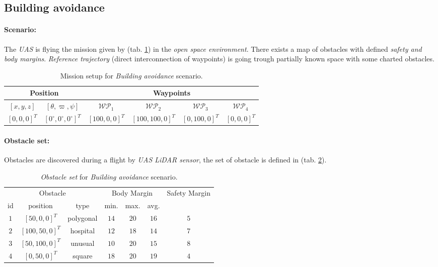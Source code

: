 \subsection{Building avoidance}\label{s:testBuildingAvoidance}

\noindent \paragraph{Scenario:} The \emph{UAS}  is flying the mission given by (tab. \ref{tab:missionSetupForBuildingAvoidanceScenario}) in the \emph{open space environment}. There exists a map of obstacles with defined \emph{safety and body margins}. \emph{Reference trajectory} (direct interconnection of waypoints) is going trough partially known space with some charted obstacles. 

\begin{table}[H]
	\centering
	\begin{tabular}{c|c||c|c|c|c}
		\multicolumn{2}{c||}{Position} & \multicolumn{4}{c}{Waypoints} \\\hline
		$[x,y,z]$     & $[\theta,\varpi,\psi]$           & $\mathscr{WP}_1$   & $\mathscr{WP}_2$   & $\mathscr{WP}_3$   & $\mathscr{WP}_4$    \\\hline\hline
		$[0,0,0]^T $       & $[0^\circ,0^\circ,0^\circ]^T$ & $[100,0,0]^T$       & $[100,100,0]^T$       & $[0,100,0]^T$       & $[0,0,0]^T$      
	\end{tabular}
	\caption{Mission setup for \emph{Building avoidance} scenario.}
	\label{tab:missionSetupForBuildingAvoidanceScenario}
\end{table}

\noindent \paragraph{Obstacle set:} Obstacles are discovered during a flight by \emph{UAS LiDAR sensor}, the set of obstacle is defined in (tab. \ref{tab:obstacleSetBuildingAvoidance}). 

\begin{table}[H]
	\centering
	\begin{tabular}{c|c|c|c|c|c|c}
		\multicolumn{3}{c|}{Obstacle} & \multicolumn{3}{c|}{Body Margin} & \multirow{2}{*}{Safety Margin}\\\cline{1-6}
		id & position & type & min. & max. & avg. &   \\\hline\hline
		$1$ & $[50,0,0]^T$ & polygonal & $14$ & $20$ & $16$ & $5$ \\\hline
		$2$ & $[100,50,0]^T$ & hospital & $12$ & $18$ & $14$ & $7$ \\\hline 
		$3$ & $[50,100,0]^T$ & unusual  & $10$ & $20$ & $15$ & $8$ \\\hline
		$4$ & $[0,50,0]^T$ & square & $18$ & $20$ & $19$ & $4$ \\
	 \end{tabular}
	\caption{\emph{Obstacle set} for \emph{Building avoidance} scenario.}
	\label{tab:obstacleSetBuildingAvoidance}
\end{table}

